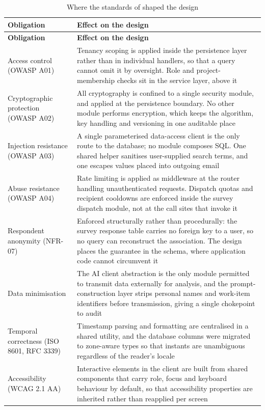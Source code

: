 \begin{longtable}{
  >{\raggedright\arraybackslash}p{}
  >{\raggedright\arraybackslash}p{}
}
\caption{Where the standards of  shaped the design}
\label{tab:standards-design}\\
\toprule
\textbf{Obligation} & \textbf{Effect on the design} \\
\midrule
\endfirsthead
\toprule
\textbf{Obligation} & \textbf{Effect on the design} \\
\midrule
\endhead
\bottomrule
\endlastfoot
Access control (OWASP A01) & Tenancy scoping is applied inside the persistence layer
rather than in individual handlers, so that a query cannot omit it by oversight. Role
and project-membership checks sit in the service layer, above it \\
\addlinespace
Cryptographic protection (OWASP A02) & All cryptography is confined to a single
security module, and applied at the persistence boundary. No other module performs
encryption, which keeps the algorithm, key handling and versioning in one auditable
place \\
\addlinespace
Injection resistance (OWASP A03) & A single parameterised data-access client is the
only route to the database; no module composes SQL. One shared helper sanitises
user-supplied search terms, and one escapes values placed into outgoing email \\
\addlinespace
Abuse resistance (OWASP A04) & Rate limiting is applied as middleware at the router
handling unauthenticated requests. Dispatch quotas and recipient cooldowns are
enforced inside the survey dispatch module, not at the call sites that invoke it \\
\addlinespace
Respondent anonymity (NFR-07) & Enforced structurally rather than procedurally: the
survey response table carries no foreign key to a user, so no query can reconstruct
the association. The design places the guarantee in the schema, where application
code cannot circumvent it \\
\addlinespace
Data minimisation & The AI client abstraction is the only module permitted to
transmit data externally for analysis, and the prompt-construction layer strips
personal names and work-item identifiers before transmission, giving a single
chokepoint to audit \\
\addlinespace
Temporal correctness (ISO 8601, RFC 3339) & Timestamp parsing and formatting are
centralised in a shared utility, and the database columns were migrated to zone-aware
types so that instants are unambiguous regardless of the reader's locale \\
\addlinespace
Accessibility (WCAG 2.1 AA) & Interactive elements in the client are built from
shared components that carry role, focus and keyboard behaviour by default, so that
accessibility properties are inherited rather than reapplied per screen \\
\end{longtable}

